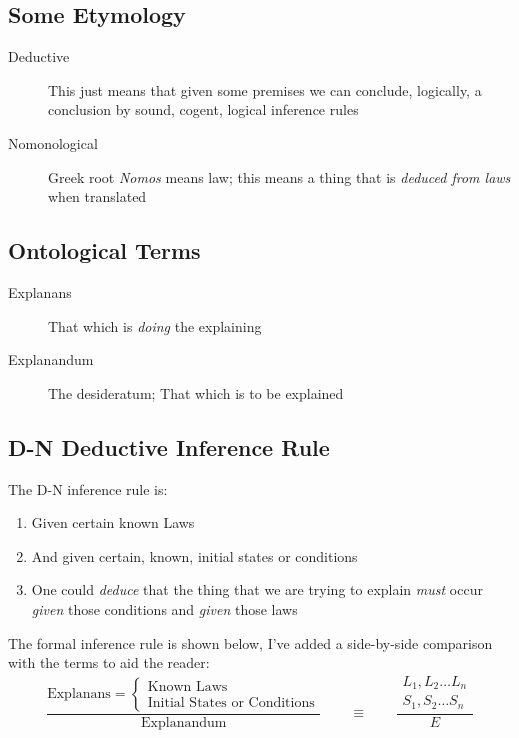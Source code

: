 \documentclass[10pt, letterpaper]{article}
\begin{document}
\subsection*{Some Etymology}
\label{sec:orgbba0742}

\begin{description}
\item[{Deductive}] This just means that given some premises we can conclude, logically, a conclusion by sound, cogent, logical inference rules
\item[{Nomonological}] Greek root \emph{Nomos} means law; this means a thing that is \emph{deduced from laws} when translated
\end{description}

\subsection*{Ontological Terms}
\label{sec:org9863b14}
\begin{description}
\item[{Explanans}] That which is \emph{doing} the explaining
\item[{Explanandum}] The desideratum; That which is to be explained
\end{description}

\subsection*{D-N Deductive Inference Rule}
\label{sec:org993a0c7}

The D-N inference rule is:
\begin{enumerate}
\item Given certain known Laws
\item And given certain, known, initial states or conditions
\item One could \emph{deduce} that the thing that we are trying to explain \emph{must} occur \emph{given} those conditions and \emph{given} those laws
\end{enumerate}

The formal inference rule is shown below, I've added a side-by-side comparison with the terms to aid the reader: \\
\begin{equation}
\frac{\text{Explanans} = \begin{cases} 
                           \text{Known Laws} \\ 
                           \text{Initial States or Conditions} 
                         \end{cases}}{\text{Explanandum}}
\quad \quad
\equiv
\quad \quad
\frac{\begin{aligned}
      L_1, L_2 \ldots L_n \\ 
      S_1, S_2 \dots S_n
      \end{aligned}}{E}
\end{equation}
\end{document}
